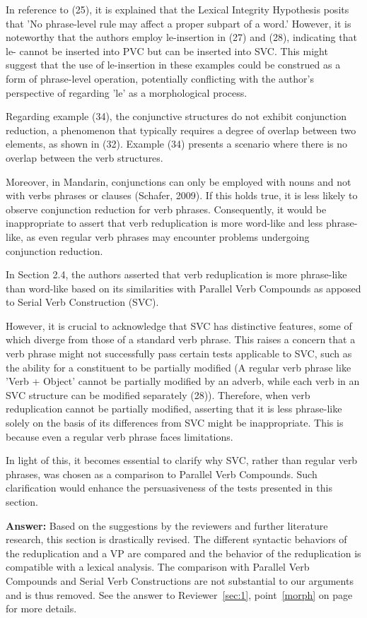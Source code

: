 \documentclass[fleqn,twoside]{article}
\begin{document}
\begin{enumerate}
In reference to (25), it is explained that the Lexical Integrity Hypothesis posits that 'No
phrase-level rule may affect a proper subpart of a word.' However, it is noteworthy that the authors
employ le-insertion in (27) and (28), indicating that le- cannot be inserted into PVC but can be
inserted into SVC. This might suggest that the use of le-insertion in these examples could be
construed as a form of phrase-level operation, potentially conflicting with the author's perspective
of regarding 'le' as a morphological process.

Regarding example (34), the conjunctive structures do not exhibit conjunction reduction, a phenomenon that typically requires a degree of overlap between two elements, as shown in (32). Example (34) presents a scenario where there is no overlap between the verb structures.

Moreover, in Mandarin, conjunctions can only be employed with nouns and not with verbs phrases or
clauses (Schafer, 2009). If this holds true, it is less likely to observe conjunction reduction for
verb phrases. Consequently, it would be inappropriate to assert that verb reduplication is more
word-like and less phrase-like, as even regular verb phrases may encounter problems undergoing
conjunction reduction.

In Section 2.4, the authors asserted that verb reduplication is more phrase-like than word-like based on its similarities with Parallel Verb Compounds as apposed to Serial Verb Construction (SVC).

However, it is crucial to acknowledge that SVC has distinctive features, some of which diverge from those of a standard verb phrase. This raises a concern that a verb phrase might not successfully pass certain tests applicable to SVC, such as the ability for a constituent to be partially modified (A regular verb phrase like 'Verb + Object' cannot be partially modified by an adverb, while each verb in an SVC structure can be modified separately (28)). Therefore, when verb reduplication cannot be partially modified, asserting that it is less phrase-like solely on the basis of its differences from SVC might be inappropriate. This is because even a regular verb phrase faces limitations.

In light of this, it becomes essential to clarify why SVC, rather than regular verb phrases, was
chosen as a comparison to Parallel Verb Compounds. Such clarification would enhance the
persuasiveness of the tests presented in this section.

\textbf{Answer:} Based on the suggestions by the reviewers and further literature research, this section is drastically revised.
The different syntactic behaviors of the reduplication and a VP are compared
and the behavior of the reduplication is compatible with a lexical analysis.
The comparison with Parallel Verb Compounds and Serial Verb Constructions are not substantial to our arguments and is thus removed.
See the answer to Reviewer~\ref{sec:1}, point~\ref{morph} on page~\pageref{morph} for more details. 


\end{enumerate}
\end{document}
